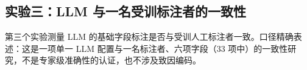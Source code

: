 \documentclass[11pt]{article}
\begin{document}
\subsection{{\cjkfont 实\allowbreak 验\allowbreak 三\allowbreak ：}LLM {\cjkfont 与\allowbreak 一\allowbreak 名\allowbreak 受\allowbreak 训\allowbreak 标\allowbreak 注\allowbreak 者\allowbreak 的\allowbreak 一\allowbreak 致\allowbreak 性}}
{\cjkfont 第\allowbreak 三\allowbreak 个\allowbreak 实\allowbreak 验\allowbreak 测\allowbreak 量} LLM {\cjkfont 的\allowbreak 基\allowbreak 础\allowbreak 字\allowbreak 段\allowbreak 标\allowbreak 注\allowbreak 是\allowbreak 否\allowbreak 与\allowbreak 受\allowbreak 训\allowbreak 人\allowbreak 工\allowbreak 标\allowbreak 注\allowbreak 者\allowbreak 一\allowbreak 致\allowbreak 。\allowbreak 口\allowbreak 径\allowbreak 精\allowbreak 确\allowbreak 表\allowbreak 述\allowbreak ：\allowbreak 这\allowbreak 是\allowbreak 一\allowbreak 项\allowbreak 单\allowbreak 一} LLM {\cjkfont 配\allowbreak 置\allowbreak 与\allowbreak 一\allowbreak 名\allowbreak 标\allowbreak 注\allowbreak 者\allowbreak 、\allowbreak 六\allowbreak 项\allowbreak 字\allowbreak 段\allowbreak （}33 {\cjkfont 项\allowbreak 中\allowbreak ）\allowbreak 的\allowbreak 一\allowbreak 致\allowbreak 性\allowbreak 研\allowbreak 究\allowbreak ，\allowbreak 不\allowbreak 是\allowbreak 专\allowbreak 家\allowbreak 级\allowbreak 准\allowbreak 确\allowbreak 性\allowbreak 的\allowbreak 认\allowbreak 证\allowbreak ，\allowbreak 也\allowbreak 不\allowbreak 涉\allowbreak 及\allowbreak 致\allowbreak 因\allowbreak 编\allowbreak 码\allowbreak 。}
\end{document}
